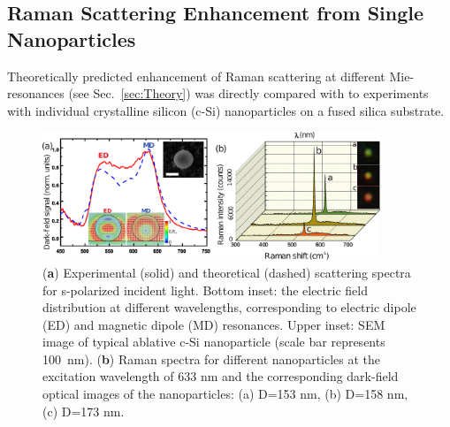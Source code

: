     \subsection{Raman Scattering Enhancement from Single Nanoparticles}
        \label{sec:RamanExp}
        Theoretically predicted enhancement of Raman scattering at different Mie-resonances (see Sec.~\ref{sec:Theory}) was directly compared with to
        experiments with individual crystalline silicon (c-Si) nanoparticles on a fused silica substrate.

        \begin{figure}[!ht]
            \begin{center}
                \includegraphics[width=0.9\textwidth]{figs/results/enhance/EnhancementExperiment.eps}
            \end{center}
            \caption{(\textbf{a}) Experimental (solid) and theoretical (dashed) scattering spectra for s-polarized incident light.
            Bottom inset: the electric field distribution at different wavelengths, corresponding to electric dipole (ED) and magnetic
            dipole (MD) resonances. Upper inset: SEM image of typical ablative c-Si nanoparticle (scale bar represents 100~nm). (\textbf{b})
            Raman spectra for different nanoparticles at the excitation wavelength of 633 nm and the corresponding dark-field optical images of the
            nanoparticles: (a) D=153 nm, (b) D=158 nm, (c) D=173 nm.}
            \label{fig:EnhancementExp}
        \end{figure}

